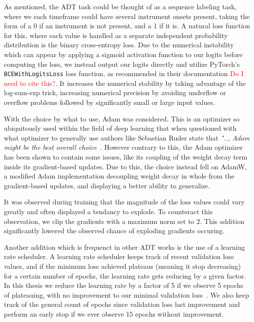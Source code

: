 As mentioned, the \gls{ADT} task could be thought of as a sequence labeling task, where we each timeframe could have several instrument onsets present, taking the form of a 0 if an instrument is not present, and a 1 if it is. A natural loss function for this, where each value is handled as a separate independent probability distribution is the binary cross-entropy loss. Due to the numerical instability which can appear by applying a sigmoid activation function to our logits before computing the loss, we instead output our logits directly and utilize PyTorch's \texttt{BCEWithLogitsLoss} loss function, as recommended in their documentation \textcolor{red}{Do I need to cite this?}. It increases the numerical stability by taking advantage of the log-sum-exp trick, increasing numerical precision by avoiding underflow or overflow problems followed by significantly small or large input values.

With the choice by what to use, Adam was considered. This is an optimizer so ubiquitously used within the field of deep learning that when questioned with what optimizer to generally use authors like Sebastian Ruder state that \textit{".., Adam might be the best overall choice}~\cite{ruder2017overviewgradientdescentoptimization}. However contrary to this, the Adam optimizer has been shown to contain some issues, like its coupling of the weight decay term inside its gradient-based updates. Due to this, the choice instead fell on AdamW, a modified Adam implementation decoupling weight decay in whole from the gradient-based updates, and displaying a better ability to generalize.~\cite{kingma2017adammethodstochasticoptimization, bock2018improvementconvergenceproofadamoptimizer, loshchilov2019decoupledweightdecayregularization}

It was observed during training that the magnitude of the loss values could vary greatly and often displayed a tendancy to explode. To counteract this observation, we clip the gradients with a maximum norm set to 2. This addition significantly lowered the observed chance of exploding gradients occuring. 

Another addition which is frequenct in other \gls{ADT} works is the use of a learning rate scheduler. A learning rate scheduler keeps track of recent validation loss values, and if the minimum loss achieved plateaus (meaning it stop decreasing) for a certain number of epochs, the learning rate gets reducing by a given factor. In this thesis we reduce the learning rate by a factor of 5 if we observe 5 epochs of plateauing, with no improvement to our minimal validation loss~\cite{chang2024yourmt3+, signals4040042}. We also keep track of the general count of epochs since validation loss last improvement and perform an early stop if we ever observe 15 epochs without improvement.

